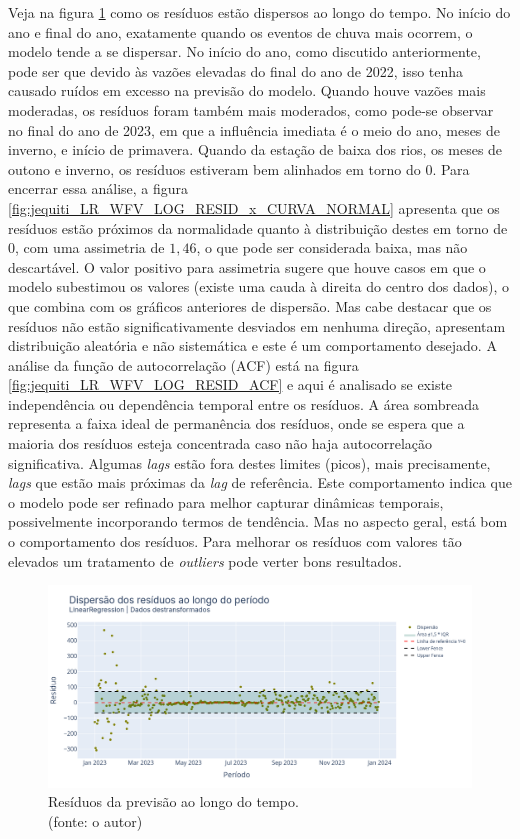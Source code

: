 Veja na figura \ref{fig:jequiti_LR_WFV_LOG_RESID_x_TEMPO} como os resíduos estão dispersos ao longo do tempo. No início do ano e final do ano, exatamente quando os eventos de chuva mais ocorrem, o modelo tende a se dispersar. No início do ano, como discutido anteriormente, pode ser que devido às vazões elevadas do final do ano de 2022, isso tenha causado ruídos em excesso na previsão do modelo. Quando houve vazões mais moderadas, os resíduos foram também mais moderados, como pode-se observar no final do ano de 2023, em que a influência imediata é o meio do ano, meses de inverno, e início de primavera. Quando da estação de baixa dos rios, os meses de outono e inverno, os resíduos estiveram bem alinhados em torno do $0$. Para encerrar essa análise, a figura \ref{fig:jequiti_LR_WFV_LOG_RESID_x_CURVA_NORMAL} apresenta que os resíduos estão próximos da normalidade quanto à distribuição destes em torno de $0$, com uma assimetria de $1,46$, o que pode ser considerada baixa, mas não descartável. O valor positivo para assimetria sugere que houve casos em que o modelo subestimou os valores (existe uma cauda à direita do centro dos dados), o que combina com os gráficos anteriores de dispersão. Mas cabe destacar que os resíduos não estão significativamente desviados em nenhuma direção, apresentam distribuição aleatória e não sistemática e este é um comportamento desejado. A análise da função de autocorrelação (ACF) está na figura \ref{fig:jequiti_LR_WFV_LOG_RESID_ACF} e aqui é analisado se existe independência ou dependência temporal entre os resíduos. A área sombreada representa a faixa ideal de permanência dos resíduos, onde se espera que a maioria dos resíduos esteja concentrada caso não haja autocorrelação significativa. Algumas \textit{lags} estão fora destes limites (picos), mais precisamente, \textit{lags} que estão mais próximas da \textit{lag} de referência. Este comportamento indica que o modelo pode ser refinado para melhor capturar dinâmicas temporais, possivelmente incorporando termos de tendência. Mas no aspecto geral, está bom o comportamento dos resíduos. Para melhorar os resíduos com valores tão elevados um tratamento de \textit{outliers} pode verter bons resultados.

\begin{figure}[!h]
	\centering
	\includegraphics[scale=0.33]{Figuras/jequiti/resultados/LR_WFV_LOG_RESID_x_TEMPO.png}
	\caption{Resíduos da previsão ao longo do tempo.\\(fonte: o autor)}
	\label{fig:jequiti_LR_WFV_LOG_RESID_x_TEMPO}
\end{figure}

